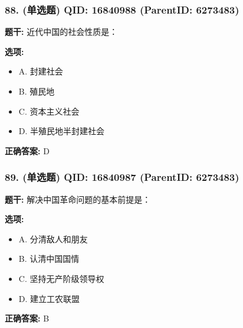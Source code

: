 \documentclass[12pt,UTF8]{ctexart}
\begin{document}
\vspace{0.3em}\hrulefill\vspace{0.7em}

\subsubsection*{88. (单选题) \small QID: 16840988 (ParentID: 6273483)}

\textbf{题干:}
近代中国的社会性质是：



\textbf{选项:}
\begin{itemize}[leftmargin=*]

  \item A. 封建社会

  \item B. 殖民地

  \item C. 资本主义社会

  \item D. 半殖民地半封建社会

\end{itemize}

\textbf{正确答案:}
D

\vspace{0.3em}\hrulefill\vspace{0.7em}

\subsubsection*{89. (单选题) \small QID: 16840987 (ParentID: 6273483)}

\textbf{题干:}
解决中国革命问题的基本前提是：



\textbf{选项:}
\begin{itemize}[leftmargin=*]

  \item A. 分清敌人和朋友

  \item B. 认清中国国情

  \item C. 坚持无产阶级领导权

  \item D. 建立工农联盟

\end{itemize}

\textbf{正确答案:}
B

\vspace{0.3em}\hrulefill\vspace{0.7em}
\end{document}
